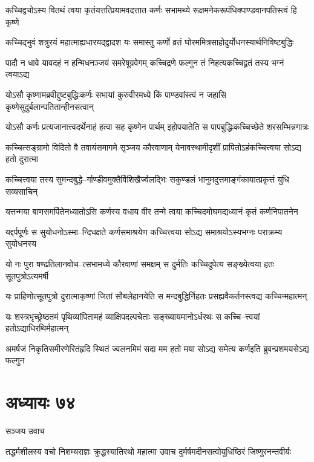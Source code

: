 \twolineshloka
{कच्चिद्वचोऽस्य वितथं त्वया कृतंयत्तत्प्रियामवदत्तात कर्णः}
{सभामथ्ये रूक्षमनेकरूपंधिक्पाण्डवानपतिस्त्वं हि कृष्णे}


\twolineshloka
{कच्चिद्भुवं शत्रुरयं महात्माह्यधारयद्द्वादश यः समास्तु}
{कर्णो व्रतं घोरममित्रसाहोदुर्योधनस्यार्थनिविष्टबुद्धिः}


\twolineshloka
{पादौ न धावे यावदहं न हन्मिधनञ्जयं समरेषूग्रवेगम्}
{कच्चिद्रणे फल्गुन तं निहत्यकच्चिद्व्रतं तस्य भग्नं त्वयाऽद्य}


\twolineshloka
{योऽसौ कृष्णामब्रवीद्दुष्टबुद्धिःकर्णः सभायां कुरुवीरमध्ये}
{किं पाण्डवांस्त्वं न जहासि कृष्णेसुदुर्बलान्पतितान्हीनसत्वान्}


\twolineshloka
{योऽसौ कर्णः प्रत्यजानात्त्वदर्थेनाहं हत्वा सह कृष्णेन पार्थम्}
{इहोपयातेति स पापबुद्धिःकच्चिच्छेते शरसम्भिन्नगात्रः}


\twolineshloka
{कच्चित्सङ्ग्रामो विदितो वै तवायंसमागमे सृञ्जय कौरवाणाम्}
{येनावस्थामीदृशीं प्रापितोऽहंकच्चित्त्वया सोऽद्य हतो दुरात्मा}


\twolineshloka
{कच्चित्त्वया तस्य सुमन्दबुद्धे--र्गाण्डीवमुक्तैर्विशिखैर्ज्वलद्भिः}
{सकुण्डलं भानुमदुत्तमाङ्गंकायात्प्रकृत्तं युधि सव्यसाचिन्}


\twolineshloka
{यत्तन्मया बाणसमर्पितेनध्यातोऽसि कर्णस्य वधाय वीर}
{तन्मे त्वया कच्चिदमोघमद्यध्यानं कृतं कर्णनिपातनेन}


\twolineshloka
{यद्दर्पपूर्णः स सुयोधनोऽस्मा--न्दिधक्षते कर्णसमाश्रयेण}
{कच्चित्त्वया सोऽद्य समाश्रयोऽस्यभग्नः पराक्रम्य सुयोधनस्य}


\twolineshloka
{यो नः पुरा षण्ढतिलानवोच--त्सभामध्ये कौरवाणां समक्षम्}
{स दुर्मतिः कच्चिदुपेत्य सङ्ख्येत्वया हतः सूतपुत्रोऽत्यमर्षी}


\twolineshloka
{यः प्राहिणोत्सूतपुत्रो दुरात्माकृष्णां जितां सौबलेहानयेति}
{स मन्दबुद्धिर्निहतः प्रसह्यवैकर्तनस्त्वद्य कच्चिन्महात्मन्}


\twolineshloka
{यः शस्त्रभृच्छ्रेष्ठतमं पृथिव्यांपितामहं व्याक्षिपदल्पचेताः}
{सङ्ख्यायमानोऽर्धरथः स कच्चि--त्त्वयां हतोऽद्याधिरथिर्महात्मन्}


\twolineshloka
{अमर्षजं निकृतिसमीरणेरितंहृदि स्थितं ज्वलनमिमं सदा मम}
{हतो मया सोऽद्य समेत्य कर्णइति ब्रुवन्प्रशमयसेऽद्य फल्गुन}


\chapter{अध्यायः ७४}
\twolineshloka
{सञ्जय उवाच}
{}


\twolineshloka
{तद्धर्मशीलस्य वचो निशम्यराज्ञः क्रुद्धस्यातिरथो महात्मा}
{उवाच दुर्मर्षमदीनसत्वोयुधिष्ठिरं जिष्णुरनन्तवीर्यः}


